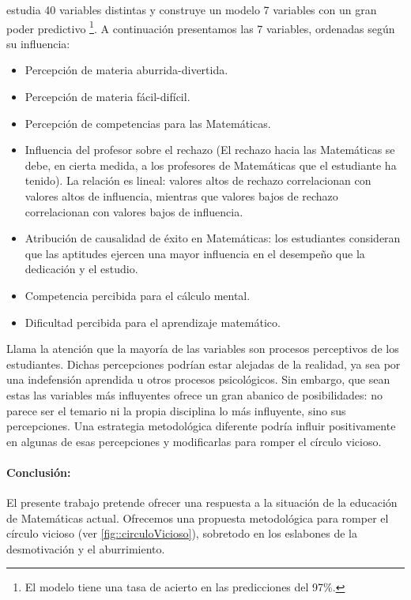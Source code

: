 \cite{ActitudesHaciaMates} estudia 40 variables distintas y construye un modelo 7 variables con un gran poder predictivo 
%
\footnote{El modelo tiene una tasa de acierto en las predicciones del 97\%.}.
%
A continuación presentamos las 7 variables, ordenadas según su influencia: 
%
\begin{itemize}
\vspace{-0.4cm}\item Percepción de materia aburrida-divertida.
\vspace{-0.4cm}\item Percepción de materia fácil-difícil.
\vspace{-0.4cm}\item Percepción de competencias para las Matemáticas.
\vspace{-0.4cm}\item Influencia del profesor sobre el rechazo (El rechazo hacia las Matemáticas se debe, en cierta medida, a los profesores de Matemáticas que el estudiante ha tenido). La relación es lineal: valores altos de rechazo correlacionan con valores altos de influencia, mientras que valores bajos de rechazo correlacionan con valores bajos de influencia.
\vspace{-0.4cm}\item Atribución de causalidad de éxito en Matemáticas: los estudiantes consideran que las aptitudes ejercen una mayor influencia en el desempeño que la dedicación y el estudio.
\vspace{-0.4cm}\item Competencia percibida para el cálculo mental.
\vspace{-0.4cm}\item Dificultad percibida para el aprendizaje matemático.
\end{itemize}

Llama la atención que la mayoría de las variables son procesos perceptivos de los estudiantes.
%
Dichas percepciones podrían estar alejadas de la realidad, ya sea por una indefensión aprendida u otros procesos psicológicos.
%
Sin embargo, que sean estas las variables más influyentes ofrece un gran abanico de posibilidades: no parece ser el temario ni la propia disciplina lo más influyente, sino sus percepciones.
%
Una estrategia metodológica diferente podría influir positivamente en algunas de esas percepciones y modificarlas para romper el círculo vicioso.

\paragraph{Conclusión:} El presente trabajo pretende ofrecer una respuesta a la situación de la educación de Matemáticas actual.
%
Ofrecemos una propuesta metodológica para romper el círculo vicioso (ver \ref{fig::circuloVicioso}), sobretodo en los eslabones de la desmotivación y el aburrimiento.

